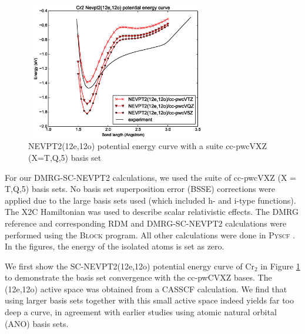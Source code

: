 \begin{figure}
  \includegraphics[width=8cm,height=6cm]{application/12o-nevpt2.eps}
  \caption{NEVPT2(12e,12o) potential energy curve with a suite cc-pwcVXZ (X=T,Q,5) basis set}
  \label{fig:12o_nevpt2}
\end{figure}

For our DMRG-SC-NEVPT2 calculations, we used the suite of cc-pwcVXZ (X = T,Q,5) basis sets. No basis set superposition error (BSSE) corrections were applied 
due to the large basis sets used (which included h- and i-type functions). The X2C Hamiltonian was used to describe scalar relativistic effects. 
The DMRG reference and corresponding RDM and DMRG-SC-NEVPT2 calculations were performed using the \textsc{Block} program\cite{sharma_spin-adapted_2012}. 
All other calculations were done in \textsc{Pyscf} \cite{sun_pyscf}. In the figures, the energy of the isolated atoms is set as zero.

We first show the SC-NEVPT2(12e,12o) potential energy curve of Cr$_2$ in Figure \ref{fig:12o_nevpt2} 
to demonstrate the basis set convergence with the cc-pwCVXZ bases. The (12e,12o) active space was obtained from a CASSCF calculation. We find that
using larger basis sets together with this small active space indeed yields far too deep a curve, in agreement with earlier studies  using atomic natural orbital (ANO) basis sets.\cite{angeli_third-order_2006}

